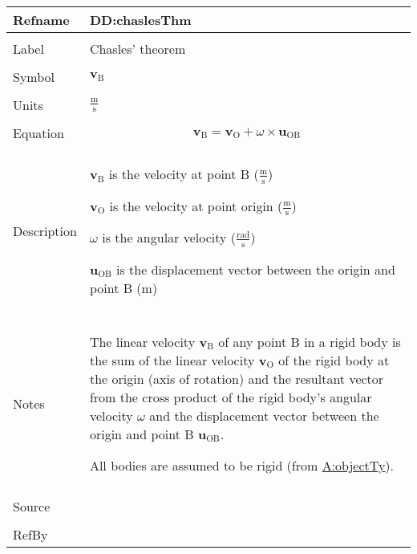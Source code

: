 \documentclass[12pt]{article}
\begin{document}
\vspace{\baselineskip}
\noindent
\begin{minipage}{\textwidth}
\begin{tabular}{>{\raggedright}p{}>{\raggedright\arraybackslash}p{}}
\toprule \textbf{Refname} & \textbf{DD:chaslesThm}
\label{DD:chaslesThm}
\\ \midrule \\
Label & Chasles' theorem
        
\\ \midrule \\
Symbol & ${\symbf{v}_{\text{B}}}$
         
\\ \midrule \\
Units & $\frac{\text{m}}{\text{s}}$
        
\\ \midrule \\
Equation & \begin{displaymath}
           {\symbf{v}_{\text{B}}}={\symbf{v}_{\text{O}}}+ω\times{\symbf{u}_{\text{O}\text{B}}}
           \end{displaymath}
\\ \midrule \\
Description & \begin{symbDescription}
              \item{${\symbf{v}_{\text{B}}}$ is the velocity at point B ($\frac{\text{m}}{\text{s}}$)}
              \item{${\symbf{v}_{\text{O}}}$ is the velocity at point origin ($\frac{\text{m}}{\text{s}}$)}
              \item{$ω$ is the angular velocity ($\frac{\text{rad}}{\text{s}}$)}
              \item{${\symbf{u}_{\text{O}\text{B}}}$ is the displacement vector between the origin and point B (${\text{m}}$)}
              \end{symbDescription}
\\ \midrule \\
Notes & The linear velocity ${\symbf{v}_{\text{B}}}$ of any point B in a rigid body is the sum of the linear velocity ${\symbf{v}_{\text{O}}}$ of the rigid body at the origin (axis of rotation) and the resultant vector from the cross product of the rigid body's angular velocity $ω$ and the displacement vector between the origin and point B ${\symbf{u}_{\text{O}\text{B}}}$.
        
        All bodies are assumed to be rigid (from \hyperref[assumpOT]{A:objectTy}).
        
\\ \midrule \\
Source & \cite{chaslesWiki}
         
\\ \midrule \\
RefBy & 
\\ \bottomrule
\end{tabular}
\end{minipage}
\end{document}
